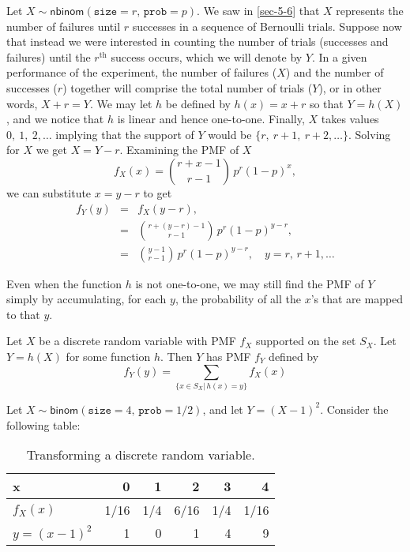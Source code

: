 Let \(X\sim\mathsf{nbinom}(\mathtt{size}=r,\,\mathtt{prob}=p)\). We
saw in \ref{sec-5-6} that \(X\) represents the number
of failures until \(r\) successes in a sequence of Bernoulli
trials. Suppose now that instead we were interested in counting the
number of trials (successes and failures) until the
\(r^{\mathrm{th}}\) success occurs, which we will denote by \(Y\). In
a given performance of the experiment, the number of failures (\(X\))
and the number of successes (\(r\)) together will comprise the total
number of trials (\(Y\)), or in other words, \(X+r=Y\). We may let
\(h\) be defined by \(h(x)=x+r\) so that \(Y=h(X)\), and we notice
that \(h\) is linear and hence one-to-one. Finally, \(X\) takes values
\(0,\ 1,\ 2,\ldots\) implying that the support of \(Y\) would be \(\{
r,\ r+1,\ r+2,\ldots \}\). Solving for \(X\) we get
\(X=Y-r\). Examining the PMF of \(X\)
\begin{equation}
f_{X}(x)={r+x-1 \choose r-1}\, p^{r}(1-p)^{x},
\end{equation}
we can substitute \( x = y - r \) to get
\begin{eqnarray*}
f_{Y}(y) & = & f_{X}(y-r),\\
 & = & {r+(y-r)-1 \choose r-1}\, p^{r}(1-p)^{y-r},\\
 & = & {y-1 \choose r-1}\, p^{r}(1-p)^{y-r},\quad y=r,\, r+1,\ldots
\end{eqnarray*}

Even when the function \(h\) is not one-to-one, we may still find the
PMF of \(Y\) simply by accumulating, for each \(y\), the probability
of all the \(x\)'s that are mapped to that \(y\).
\begin{prop}
Let \(X\) be a discrete random variable with PMF \(f_{X}\) supported
on the set \(S_{X}\). Let \(Y=h(X)\) for some function \(h\). Then
\(Y\) has PMF \(f_{Y}\) defined by
\begin{equation}
f_{Y}(y)=\sum_{\{x\in S_{X}|\, h(x)=y\}}f_{X}(x)
\end{equation}
\end{prop}


Let \(X\sim\mathsf{binom}(\mathtt{size}=4,\,\mathtt{prob}=1/2)\), and let \(Y=(X-1)^{2}\). Consider the following table:

\begin{table}[htb]
\caption[Transform discrete random variable]{\label{tab-disc-transf}Transforming a discrete random variable.}
\centering
\begin{tabular}{lrrrrr}
x & 0 & 1 & 2 & 3 & 4\\
\hline
\(f_{X}(x)\) & 1/16 & 1/4 & 6/16 & 1/4 & 1/16\\
\hline
\(y=(x-1)^{2}\) & 1 & 0 & 1 & 4 & 9\\
\end{tabular}
\end{table}

